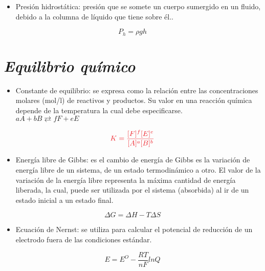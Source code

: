 \documentclass[letterpaper,12pt]{article}
\begin{document}
    \begin{itemize}
    \item [\ding{126}]
    \small{Presión hidrostática: presión que se somete un cuerpo sumergido en un fluido, debido a la columna de líquido que tiene sobre él.}.
    \end{itemize}
    \begin{equation*}
    P_h=\rho gh
\end{equation*}

\section{\textit{Equilibrio químico}}
\begin{itemize}
    \item [\ding{171}]
    \small{Constante de equilibrio: se expresa como la relación entre las concentraciones molares (mol/l) de reactivos y productos. Su valor en una reacción química depende de la temperatura la cual debe especificarse. $aA+bB\rightleftarrows fF+eE\hspace{1cm}$}
    \end{itemize}
    \begin{equation*}
    \textcolor{Red}{K=\frac{[F]^f[E]^e}{[A]^a[B]^b}}
    \end{equation*}
    
    \begin{itemize}
    \item [\ding{118}]
    \small{Energía libre de Gibbs: es el cambio de energía de Gibbs es la variación de energía libre de un sistema, de un estado termodinámico a otro. El valor de la variación de la energía libre representa la máxima cantidad de energía liberada, la cual, puede ser utilizada por el sistema (absorbida) al ir de un estado inicial a un estado final.}
    \end{itemize}
    \begin{equation*}
    \Delta G=\Delta H-T\Delta S
    \end{equation*}
    
\begin{itemize}
    \item [\ding{101}]
    \small{Ecuación de Nernst: se utiliza para calcular el potencial de reducción de un electrodo fuera de las condiciones estándar.}
    \end{itemize}
    \begin{equation*}%
    E=E^O-\frac{RT}{nF}lnQ
    \end{equation*}
\end{document}
